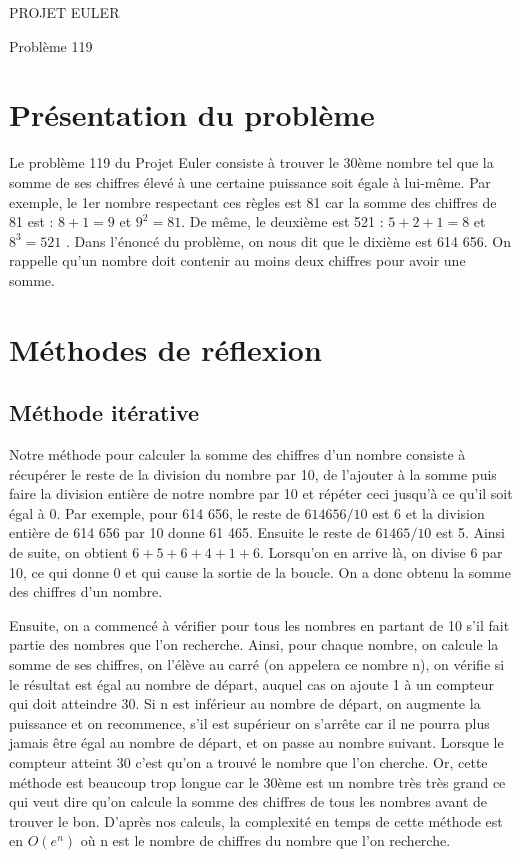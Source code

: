 \documentclass{article}
\begin{document}
\hfill
\hfill
\hfill
\begin{center}
  \large{PROJET EULER}

  Problème 119
\end{center}
\tableofcontents
\vspace{2.2cm}
\section {Présentation du problème}

Le problème 119 du Projet Euler consiste à trouver le 30ème nombre tel que la somme de ses chiffres élevé à une certaine puissance soit égale à lui-même. Par exemple, le 1er nombre respectant ces règles est 81 car la somme des chiffres de 81 est : $ 8 + 1 = 9 $ et $ 9^{2} = 81 $. De même, le deuxième est 521 : $ 5 + 2 + 1 = 8 $ et $ 8^{3} = 521 $	. Dans l'énoncé du problème, on nous dit que le dixième est 614 656. On rappelle qu'un nombre doit contenir au moins deux chiffres pour avoir une somme.

\section{Méthodes de réflexion}

\subsection{Méthode itérative}

Notre méthode pour calculer la somme des chiffres d'un nombre consiste à récupérer le reste de la division du nombre par 10, de l'ajouter à la somme puis faire la division entière de notre nombre par 10 et répéter ceci jusqu'à ce qu'il soit égal à 0. Par exemple, pour 614 656, le reste de $614656/10$ est 6 et la division entière de 614 656 par 10 donne 61 465. Ensuite le reste de $61465/10$ est 5. Ainsi de suite, on obtient $6 + 5 + 6 + 4 + 1 + 6$. Lorsqu'on en arrive là, on divise 6 par 10, ce qui donne 0 et qui cause la sortie de la boucle. On a donc obtenu la somme des chiffres d'un nombre.
\newline

Ensuite, on a commencé à  vérifier pour tous les nombres en partant de 10 s'il fait partie des nombres que l'on recherche. Ainsi, pour chaque nombre, on calcule la somme de ses chiffres, on l'élève au carré (on appelera ce nombre n), on vérifie si le résultat est égal au nombre de départ, auquel cas on ajoute 1 à un compteur qui doit atteindre 30. Si n est inférieur au nombre de départ, on augmente la puissance et on recommence, s'il est supérieur on s'arrête car il ne pourra plus jamais être égal au nombre de départ, et on passe au nombre suivant. Lorsque le compteur atteint 30 c'est qu'on a trouvé le nombre que l'on cherche. Or, cette méthode est beaucoup trop longue car le 30ème est un nombre très très grand ce qui veut dire qu'on calcule la somme des chiffres de tous les nombres avant de trouver le bon. D'après nos calculs, la complexité en temps de cette méthode est en $O(e^{n})$  où n est le nombre de chiffres du nombre que l'on recherche.
\end{document}
